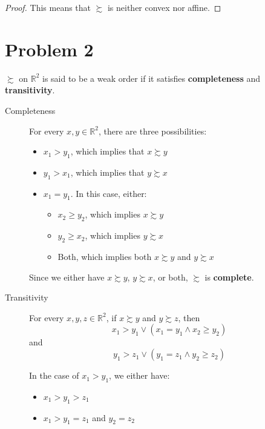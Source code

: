 \documentclass[12pt]{extarticle}
\numberwithin{table}{section}
\numberwithin{figure}{section}
\numberwithin{equation}{section}
\begin{document}
\begin{enumerate}[label=\alph*.)]
\begin{proof}
		      This means that $\succsim$ is neither convex nor affine.
	      \end{proof}
\end{enumerate}

\section*{Problem 2}

$\succsim$ on $\mathbb{R}^2$ is said to be a weak order if it satisfies \textbf{completeness} and \textbf{transitivity}.

\begin{description}
	\item[Completeness]
	      For every $x, y \in \mathbb{R}^2$, there are three possibilities:
	      \begin{itemize}
		      \item $x_1 > y_1$, which implies that $x \succsim y$
		      \item $y_1 > x_1$, which implies that $y \succsim x$
		      \item $x_1 = y_1$. In this case, either:
		            \begin{itemize}
			            \item $x_2 \ge y_2$, which implies $x \succsim y$
			            \item $y_2 \ge x_2$, which implies $y \succsim x$
			            \item Both, which implies both $x \succsim y$ and $y \succsim x$
		            \end{itemize}
	      \end{itemize}
	      Since we either have $x \succsim y$, $y \succsim x$, or both, $\succsim$ is \textbf{complete}.
	\item[Transitivity]
	      For every $x, y, z \in \mathbb{R}^2$, if $x \succsim y$ and $y \succsim z$, then
	      \begin{equation}
		      x_1 > y_1 \lor (x_1 = y_1 \land x_2 \ge y_2)
	      \end{equation}
	      and
	      \begin{equation}
		      y_1 > z_1 \lor (y_1 = z_1 \land y_2 \ge z_2)
	      \end{equation}

	      In the case of $x_1 > y_1$, we either have:
	      \begin{itemize}
		      \item $x_1 > y_1 > z_1$
		      \item $x_1 > y_1 = z_1$ and $y_2 = z_2$
	      \end{itemize}


\end{description}
\end{document}
